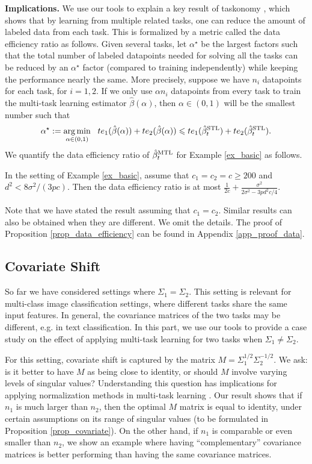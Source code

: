 \textbf{Implications.} We use our tools to explain a key result of taskonomy \cite{ZSSGM18}, which shows that by learning from multiple related tasks, one can reduce the amount of labeled data from each task.
This is formalized by a metric called the data efficiency ratio as follows.
Given several tasks, let $\alpha^{\star}$ be the largest factors such that the total number of labeled datapoints needed for solving all the tasks can be reduced by an $\alpha^{\star}$ factor (compared to training independently) while keeping the performance nearly the same.
More precisely, suppose we have $n_i$ datapoints for each task, for $i= 1, 2$.
If we only use $\alpha n_i$ datapoints from every task to train the multi-task learning estimator $\hat{\beta}(\alpha)$, then $\alpha \in (0, 1)$ will be the smallest number such that
\[ \alpha^{\star} :=\operatorname*{arg\,min}_{\alpha\in(0, 1)} ~~ te_1(\hat{\beta}(\alpha)) + te_2(\hat{\beta}(\alpha))\leqslant te_1(\hat{\beta}_t^{\text{STL}}) + te_2(\hat{\beta}_t^{\text{STL}}). \]
We quantify the data efficiency ratio of $\hat{\beta}_t^{\text{MTL}}$ for Example \ref{ex_basic} as follows.

\begin{proposition}\label{prop_data_efficiency}
	In the setting of Example \ref{ex_basic}, assume that $c_1 = c_2 = c \ge 200$ and $d^2 < {8\sigma^2} /{(3p c)}$.
	Then the data efficiency ratio is at most $\frac{1}{2c} + \frac{\sigma^2}{2\sigma^2 - 3p d^2 c / 4}$.
\end{proposition}
Note that we have stated the result assuming that $c_1 = c_2$.
Similar results can also be obtained when they are different.
We omit the details.
The proof of Proposition \ref{prop_data_efficiency} can be found in Appendix \ref{app_proof_data}.




\subsection{Covariate Shift}\label{sec_covariate}

So far we have considered settings where $\Sigma_1 = \Sigma_2$.
This setting is relevant for multi-class image classification settings, where different tasks share the same input features.
In general, the covariance matrices of the two tasks may be different, e.g. in text classification.
In this part, we use our tools to provide a case study on the effect of applying multi-task learning for two tasks when $\Sigma_1 \neq \Sigma_2$.

For this setting, covariate shift is captured by the matrix $M = \Sigma_1^{1/2} \Sigma_2^{-1/2}$.
We ask: is it better to have $M$ as being close to identity, or should $M$ involve varying levels of singular values?
Understanding this question has implications for applying normalization methods in multi-task learning \cite{LV19,CBLR18,YKGLHF20}.
Our result shows that if $n_1$ is much larger than $n_2$, then the optimal $M$ matrix is equal to identity, under certain assumptions on its range of singular values (to be formulated in Proposition \ref{prop_covariate}).
On the other hand, if $n_1$ is comparable or even smaller than $n_2$, we show an example where having ``complementary'' covariance matrices is better performing than having the same covariance matrices.

